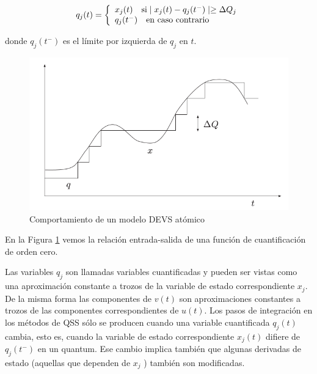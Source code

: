 	\begin{equation}
	q_j(t) = \left\{ 
	  \begin{array}{l l}
	    x_j(t)  \quad \text{si} \mid x_j (t ) - q_j (t^{-} ) \mid \geq \Delta Q_j \\
	    q_j (t^{-} ) \quad \text{en caso contrario}
	  \end{array} \right.
	\end{equation}
	
	donde $q_j (t^{-})$ es el límite por izquierda de $q_j$ en $t$.
	
	\begin{figure}[!htbp]
	  \includegraphics[scale=0.5]{histeresis1}
	  \caption{Comportamiento de un modelo DEVS atómico}
	   \label{fig:fig2-2}
	\end{figure}
	
	En la Figura \ref{fig:fig2-2} vemos la relación entrada-salida de una función de cuantificación de orden cero.
	
	Las variables $q_j$ son llamadas variables cuantificadas y pueden ser vistas como una aproximación constante a trozos de la variable de estado 
	correspondiente $x_j$. De la misma forma las componentes de $v(t)$ son aproximaciones constantes a trozos de las componentes correspondientes de $u(t)$. 
	Los pasos de integración en los métodos de QSS sólo se producen cuando una variable cuantificada $q_j (t)$ cambia, esto es, cuando la variable de 
	estado correspondiente $x_j (t)$ difiere de $q_j(t^{-})$ en un quantum. Ese cambio implica también que algunas derivadas de estado (aquellas que 
	dependen de $x_j$ ) también son modificadas. 

